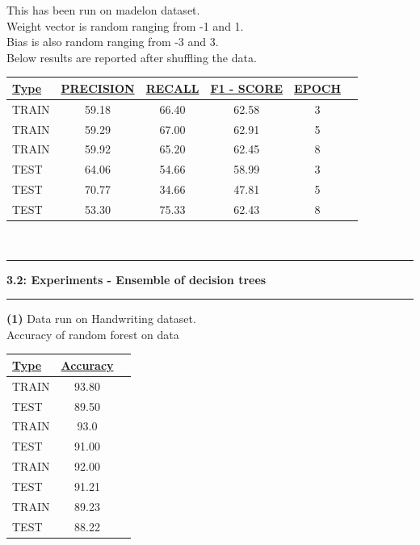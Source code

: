 \documentclass[11pt]{article}
\newcommand\question[2]{\vspace{.25in}\hrule\textbf{#1: #2}\vspace{.5em}\hrule\vspace{.10in}}
\renewcommand\part[1]{\vspace{.10in}\textbf{(#1)}}
\begin{document}
This has been run on madelon dataset.\\
Weight vector is random ranging from -1 and 1.\\
Bias is also random ranging from -3 and 3.\\
Below results are reported after shuffling the data.\\[15pt]
\bgroup 
\def\arraystretch{1.2}
\begin{tabular}{|l|c|c|c|c|c|} \hline 
{\bf \underline {Type}} & {\bf \underline {PRECISION}} & {\bf \underline {RECALL}} & {\bf \underline {F1 - SCORE}} & {\bf \underline {EPOCH}}\\ \hline
TRAIN & 59.18 & 66.40 & 62.58 & 3\\ \hline
TRAIN & 59.29 & 67.00 & 62.91 & 5\\ \hline
TRAIN & 59.92 & 65.20 & 62.45 & 8\\ \hline
TEST & 64.06 & 54.66 & 58.99 & 3\\ \hline
TEST & 70.77 & 34.66 & 47.81 & 5\\ \hline
TEST & 53.30 & 75.33 & 62.43 & 8\\ \hline

\end{tabular}
\egroup\\[20pt]

\question{3.2}{Experiments - Ensemble of decision trees }
\part{1}
Data run on Handwriting dataset.\\\bgroup
Accuracy of random forest on data\\
 
\def\arraystretch{1.2}
\begin{tabular}{|l|c|c|} \hline 
{\bf \underline {Type}} & {\bf \underline {Accuracy}}\\ \hline
TRAIN & 93.80 \\ \hline
TEST & 89.50 \\ \hline
TRAIN & 93.0 \\ \hline
TEST & 91.00 \\ \hline
TRAIN & 92.00 \\ \hline
TEST & 91.21 \\ \hline
TRAIN & 89.23 \\ \hline
TEST & 88.22 \\ \hline

\end{tabular}
\egroup\\[20pt]
\end{document}
